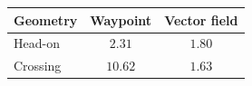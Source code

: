 \begin{tabular}{lcc}
\hline
Geometry & Waypoint & Vector field \\
\hline
Head-on & $2.31$ & $1.80$ \\
Crossing & $10.62$ & $1.63$ \\
\hline
\end{tabular}
